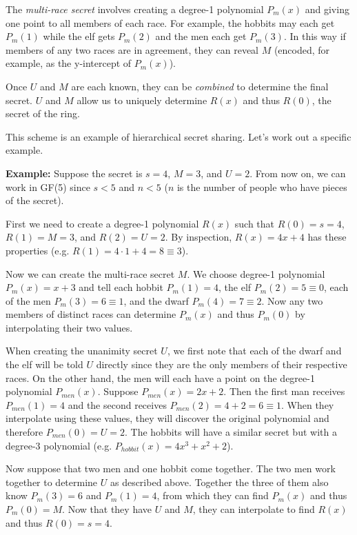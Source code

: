 \documentclass[]{article}
\begin{document}
\begin{qunlist}
{{The \textit{multi-race secret} involves creating a degree-1 polynomial $P_m(x)$ and giving one point to all members of each race. For example, the hobbits may each get $P_m(1)$ while the elf gets $P_m(2)$ and the men each get $P_m(3)$. In this way if members of any two races are in agreement, they can reveal $M$ (encoded, for example, as the y-intercept of $P_m(x)$).

Once $U$ and $M$ are each known, they can be \textit{combined} to determine the final secret. $U$ and $M$ allow us to uniquely determine $R(x)$ and thus $R(0)$, the secret of the ring.

This scheme is an example of hierarchical secret sharing. Let's work out a specific example.

\textbf{Example:} Suppose the secret is $s=4$, $M=3$, and $U=2$. From now on, we can work in GF(5) since $s<5$ and $n<5$ ($n$ is the number of people who have pieces of the secret).

First we need to create a degree-1 polynomial $R(x)$ such that $R(0)=s=4$, $R(1)=M=3$, and $R(2)=U=2$. By inspection, $R(x) = 4x + 4$ has these properties (e.g. $R(1) = 4\cdot1 + 4 = 8 \equiv 3$).

Now we can create the multi-race secret $M$. We choose degree-1 polynomial $P_m(x) = x+3$ and tell each hobbit $P_m(1)=4$, the elf $P_m(2)=5\equiv0$, each of the men $P_m(3)=6 \equiv 1$, and the dwarf $P_m(4) = 7 \equiv 2$. Now any two members of distinct races can determine $P_m(x)$ and thus $P_m(0)$ by interpolating their two values.

When creating the unanimity secret $U$, we first note that each of the dwarf and the elf will be told $U$ directly since they are the only members of their respective races. On the other hand, the men will each have a point on the degree-1 polynomial $P_{men}(x)$. Suppose $P_{men}(x) = 2x+2$. Then the first man receives $P_{men}(1) = 4$ and the second receives $P_{men}(2) = 4+2 = 6 \equiv 1$. When they interpolate using these values, they will discover the original polynomial and therefore $P_{men}(0) = U = 2$. The hobbits will have a similar secret but with a degree-3 polynomial (e.g. $P_{hobbit}(x) = 4x^3 + x^2 + 2$).

Now suppose that two men and one hobbit come together. The two men work together to determine $U$ as described above. Together the three of them also know $P_m(3)=6$ and $P_m(1)=4$, from which they can find $P_m(x)$ and thus $P_m(0) = M$. Now that they have $U$ and $M$, they can interpolate to find $R(x)$ and thus $R(0) = s = 4$.




}}
\end{qunlist}
\end{document}
